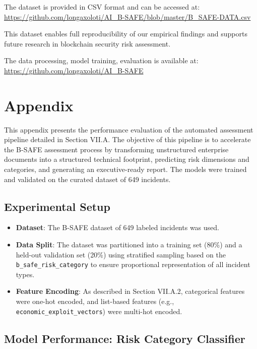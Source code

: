 \documentclass[a4paper]{article}
\begin{document}
\begin{multicols}{2}
The dataset is provided in CSV format and can be accessed at:
\url{https://github.com/longaxoloti/AI_B-SAFE/blob/master/B_SAFE-DATA.csv}

This dataset enables full reproducibility of our empirical findings and supports future research in blockchain security risk assessment.

The data processing, model training, evaluation is available at:
\url{https://github.com/longaxoloti/AI_B-SAFE}



\newpage
\appendix
\section*{Appendix}
\label{appendix:pipeline_evaluation}

This appendix presents the performance evaluation of the automated assessment pipeline detailed in Section VII.A. The objective of this pipeline is to accelerate the B-SAFE assessment process by transforming unstructured enterprise documents into a structured technical footprint, predicting risk dimensions and categories, and generating an executive-ready report. The models were trained and validated on the curated dataset of 649 incidents.

\subsection{Experimental Setup}

\begin{itemize}
    \item \textbf{Dataset}: The B-SAFE dataset of 649 labeled incidents was used.
    \item \textbf{Data Split}: The dataset was partitioned into a training set (80\%) and a held-out validation set (20\%) using stratified sampling based on the \texttt{b\_safe\_risk\_category} to ensure proportional representation of all incident types.
    \item \textbf{Feature Encoding}: As described in Section VII.A.2, categorical features were one-hot encoded, and list-based features (e.g., \texttt{economic\_exploit\_vectors}) were multi-hot encoded.
\end{itemize}

\subsection{Model Performance: Risk Category Classifier}


\end{multicols}
\end{document}
